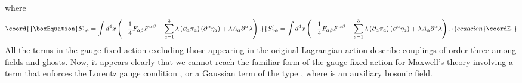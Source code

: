 \documentclass[a4paper,12pt]{article}
\begin{document}
where 
\begin{equation}\coord{}\boxEquation{
S_{1\psi }^{\prime }=\int d^{4}x\left( -\frac{1}{4}F_{\alpha \beta
}F^{\alpha \beta }-\sum\limits_{a=1}^{3}\lambda \left( \partial _{\alpha
}\pi _{a}\right) \left( \partial ^{\alpha }\eta _{a}\right) +\lambda
A_{\alpha }\partial ^{\alpha }\lambda \right) .  \label{sp3.e37}
}{
S_{1\psi }^{\prime }=\int d^{4}x\left( -\frac{1}{4}F_{\alpha \beta
}F^{\alpha \beta }-\sum\limits_{a=1}^{3}\lambda \left( \partial _{\alpha
}\pi _{a}\right) \left( \partial ^{\alpha }\eta _{a}\right) +\lambda
A_{\alpha }\partial ^{\alpha }\lambda \right) .  }{ecuacion}\coordE{}\end{equation}
All the terms in the gauge-fixed action excluding those appearing in the
original Lagrangian action describe couplings of order three among fields
and ghosts. Now, it appears clearly that we cannot reach the familiar form
of the gauge-fixed action for Maxwell's theory involving a term \coordHE{} that enforces the Lorentz gauge condition \coordHE{}, or a Gaussian term of the type \coordHE{}, where \coordHE{} is an auxiliary
bosonic field.
\end{document}
